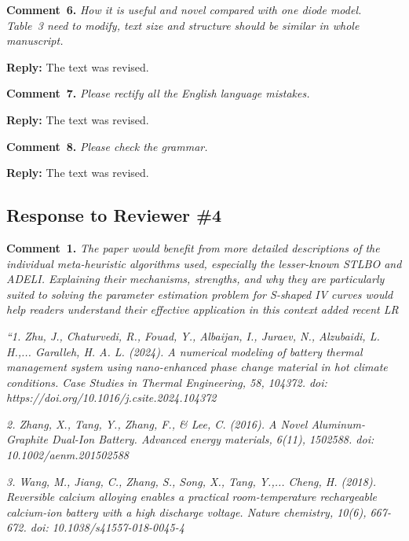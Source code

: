 \documentclass[a4paper,fleqn]{cas-sc}
\begin{document}
\vspace{1cm}
\noindent
\textcolor[rgb]{0.00,0.50,1.00}{\textbf{Comment~6.}}
\emph{How it is useful and novel compared with one diode model. 
Table~3 need to modify, text size and structure should be similar in whole manuscript.}

\noindent
\textcolor[rgb]{0.51,0.00,0.00}{\textbf{Reply:}}
The text was revised.

\vspace{1cm}
\noindent
\textcolor[rgb]{0.00,0.50,1.00}{\textbf{Comment~7.}}
\emph{Please rectify all the English language mistakes.}

\noindent
\textcolor[rgb]{0.51,0.00,0.00}{\textbf{Reply:}}
The text was revised.

\vspace{1cm}
\noindent
\textcolor[rgb]{0.00,0.50,1.00}{\textbf{Comment~8.}}
\emph{Please check the grammar.}

\noindent
\textcolor[rgb]{0.51,0.00,0.00}{\textbf{Reply:}}
The text was revised.


\vspace{1cm}
\subsection*{Response to Reviewer \#4 }


\noindent
\textcolor[rgb]{0.00,0.50,1.00}{\textbf{Comment~1.}}
\emph{The paper would benefit from more detailed descriptions of the individual meta-heuristic algorithms used, 
especially the lesser-known STLBO and ADELI. 
Explaining their mechanisms, strengths, and why they are particularly suited to solving the parameter estimation problem 
for S-shaped IV curves would help readers understand their effective application in this 
context added recent LR} 

\emph{
``1. Zhu, J., Chaturvedi, R., Fouad, Y., Albaijan, I., Juraev, N., Alzubaidi, L. H.,... Garalleh, H. A. L. (2024). 
A numerical modeling of battery thermal management system using nano-enhanced phase 
change material in hot climate conditions. Case Studies in Thermal Engineering, 58, 104372. 
doi: https://doi.org/10.1016/j.csite.2024.104372 
}

\emph{
2. Zhang, X., Tang, Y., Zhang, F., \& Lee, C. (2016). 
A Novel Aluminum-Graphite Dual-Ion Battery. Advanced energy materials, 6(11), 1502588. 
doi: 10.1002/aenm.201502588 
}

\emph{
3. Wang, M., Jiang, C., Zhang, S., Song, X., Tang, Y.,... Cheng, H. (2018). 
Reversible calcium alloying enables a practical room-temperature rechargeable 
calcium-ion battery with a high discharge voltage. Nature chemistry, 10(6), 667-672. 
doi: 10.1038/s41557-018-0045-4 
}
\end{document}
